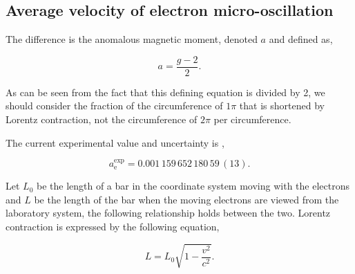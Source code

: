\documentclass[%
 reprint,
 amsmath,amssymb,
 aps,
]{revtex4-1}
\numberwithin{equation}{section}%
\begin{document}
\subsection{Average velocity of electron micro-oscillation}


The difference is the anomalous magnetic moment, denoted $a$ and defined as,

    \begin{equation}
        {\displaystyle a={\frac {g-2}{2}}} .
        \label{III.1}
    \end{equation}


As can be seen from the fact that this defining equation is divided by 2, we should consider the fraction of the circumference of $1\pi$ that is shortened by Lorentz contraction, not the circumference of $2\pi$ per circumference.



The current experimental value and uncertainty is \cite{Fan},

    \begin{equation} %
          {\displaystyle a^{\text{exp}}_{\text{e}}=0.001\,159\,652\,180\,59\,(13)} .
          \label{}
    \end{equation}


Let $L_0$ be the length of a bar in the coordinate system moving with the electrons and $L$ be the length of the bar when the moving electrons are viewed from the laboratory system, the following relationship holds between the two. Lorentz contraction is expressed by the following equation,


    \begin{equation}
        L = L_0 \sqrt{1 - \frac{v^2}{c^2}} .
    \end{equation}


\end{document}
